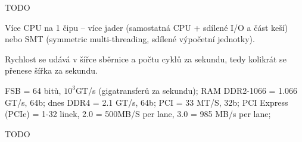 \documentclass[12pt]{article}                   %
\begin{document}

        TODO


        \begin{poznamka}
            Více CPU na 1 čipu -- více jader (samostatná CPU + sdílené I/O a část keší) nebo SMT (symmetric multi-threading, sdílené výpočetní jednotky).
        \end{poznamka}

        \begin{definice}[Sběrnice]
            Rychlost se udává v šířce sběrnice a počtu cyklů za sekundu, tedy kolikrát se přenese šířka za sekundu.

            FSB = 64 bitů, $10^3$GT/s (gigatransferů za sekundu); RAM DDR2-1066 = 1.066 GT/s, 64b; dnes DDR4 = 2.1 GT/s, 64b; PCI = 33 MT/S, 32b; PCI Express (PCIe) = 1-32 linek, 2.0 = 500MB/S per lane, 3.0 = 985 MB/s per lane;

            TODO
        \end{definice}

\end{document}
